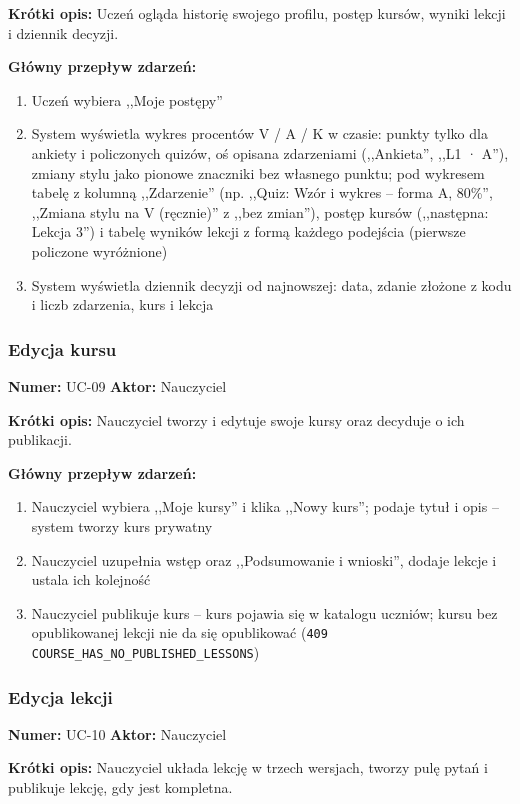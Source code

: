 \textbf{Krótki opis:} Uczeń ogląda historię swojego profilu, postęp kursów, wyniki lekcji i dziennik decyzji.

\textbf{Główny przepływ zdarzeń:}
\begin{enumerate}[leftmargin=*]
    \item Uczeń wybiera ,,Moje postępy''
    \item System wyświetla wykres procentów V / A / K w czasie: punkty tylko dla ankiety i policzonych quizów, oś opisana zdarzeniami (,,Ankieta'', ,,L1 · A''), zmiany stylu jako pionowe znaczniki bez własnego punktu; pod wykresem tabelę z kolumną ,,Zdarzenie'' (np. ,,Quiz: Wzór i wykres -- forma A, 80\%'', ,,Zmiana stylu na V (ręcznie)'' z ,,bez zmian''), postęp kursów (,,następna: Lekcja 3'') i tabelę wyników lekcji z formą każdego podejścia (pierwsze policzone wyróżnione)
    \item System wyświetla dziennik decyzji od najnowszej: data, zdanie złożone z kodu i liczb zdarzenia, kurs i lekcja
\end{enumerate}

\subsubsection{Edycja kursu}
\textbf{Numer:} UC-09 \quad \textbf{Aktor:} Nauczyciel

\textbf{Krótki opis:} Nauczyciel tworzy i edytuje swoje kursy oraz decyduje o ich publikacji.

\textbf{Główny przepływ zdarzeń:}
\begin{enumerate}[leftmargin=*]
    \item Nauczyciel wybiera ,,Moje kursy'' i klika ,,Nowy kurs''; podaje tytuł i opis -- system tworzy kurs prywatny
    \item Nauczyciel uzupełnia wstęp oraz ,,Podsumowanie i wnioski'', dodaje lekcje i ustala ich kolejność
    \item Nauczyciel publikuje kurs -- kurs pojawia się w katalogu uczniów; kursu bez opublikowanej lekcji nie da się opublikować (\texttt{409 COURSE\_HAS\_NO\_PUBLISHED\_LESSONS})
\end{enumerate}

\subsubsection{Edycja lekcji}
\textbf{Numer:} UC-10 \quad \textbf{Aktor:} Nauczyciel

\textbf{Krótki opis:} Nauczyciel układa lekcję w trzech wersjach, tworzy pulę pytań i publikuje lekcję, gdy jest kompletna.

